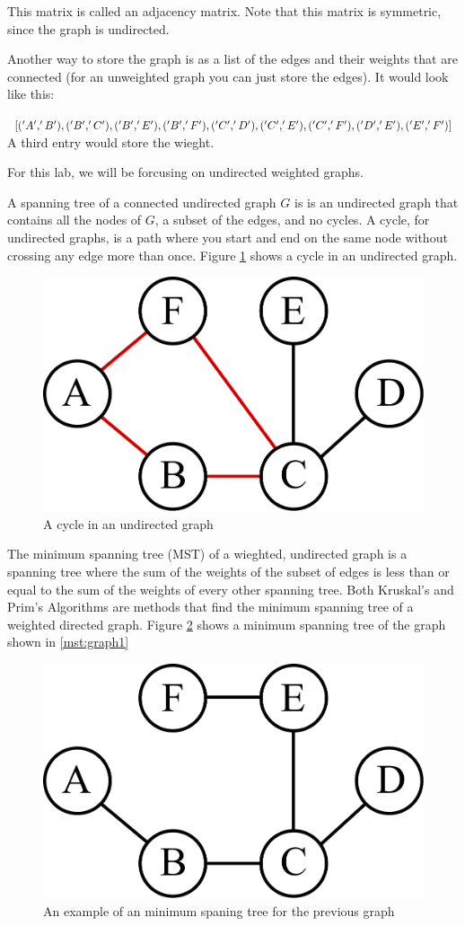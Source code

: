 This matrix is called an adjacency matrix.
Note that this matrix is symmetric, since the graph is undirected. 

Another way to store the graph is as a list of the edges and their weights that are connected (for an unweighted graph you can just store the edges).
It would look like this:

$[('A', 'B'),
 ('B', 'C'),
 ('B', 'E'),
 ('B', 'F'),
 ('C', 'D'),\\
 ('C', 'E'),
 ('C', 'F'),
 ('D', 'E'),
 ('E', 'F')]$\\
A third entry would store the wieght.

For this lab, we will be forcusing on undirected weighted graphs. 

A spanning tree of a connected undirected graph $G$ is is an undirected graph that contains all the nodes of $G$, a subset of the edges, and no cycles.
A cycle, for undirected graphs, is a path where you start and end on the same node without crossing any edge more than once.
Figure \ref{mst:graph3} shows a cycle in an undirected graph.

\begin{figure}[H]
\includegraphics[width = .4\textwidth]{graph3.pdf}
\caption{A cycle in an undirected graph}
\label{mst:graph3}
\end{figure}

The minimum spanning tree (MST) of a wieghted, undirected graph is a spanning tree where the sum of the weights of the subset of edges is less than or equal to the sum of the weights of every other spanning tree.
Both Kruskal's and Prim's Algorithms are methods that find the minimum spanning tree of a weighted directed graph.
Figure \ref{mst:graph2} shows a minimum spanning tree of the graph shown in \ref{mst:graph1}

\begin{figure}[H]
\includegraphics[width = .4\textwidth]{graph2.pdf}
\caption{An example of an minimum spaning tree for the previous graph}
\label{mst:graph2}
\end{figure}


